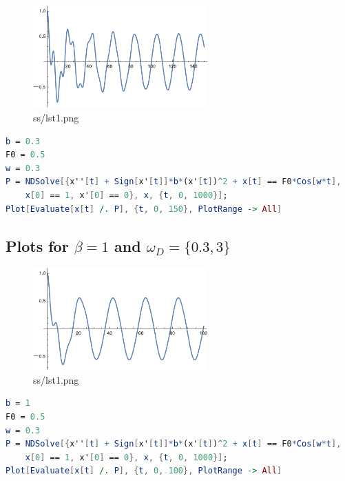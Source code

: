\documentclass[12pt,letter]{article}
\begin{document}
{\begin{tcolorbox}
	\begin{figure}[H]
		\centering
		\includegraphics[width=0.6\textwidth]{ss/lst02.png}
		\caption{ss/lst1.png}
		\label{fig:ss-lst1-png}
	\end{figure}
\begin{lstlisting}[language=Mathematica]
b = 0.3
F0 = 0.5
w = 0.3
P = NDSolve[{x''[t] + Sign[x'[t]]*b*(x'[t])^2 + x[t] == F0*Cos[w*t], 
    x[0] == 1, x'[0] == 0}, x, {t, 0, 1000}];
Plot[Evaluate[x[t] /. P], {t, 0, 150}, PlotRange -> All]
\end{lstlisting}
\end{tcolorbox}



\subsection*{Plots for $\beta = 1$ and $\omega_D = \{0.3, 3\} $ }
\begin{tcolorbox}
	\begin{figure}[H]
		\centering
		\includegraphics[width=0.6\textwidth]{ss/honky3.png}
		\caption{ss/lst1.png}
		\label{fig:ss-lst1-png}
	\end{figure}
\begin{lstlisting}[language=Mathematica]
b = 1
F0 = 0.5
w = 0.3
P = NDSolve[{x''[t] + Sign[x'[t]]*b*(x'[t])^2 + x[t] == F0*Cos[w*t], 
    x[0] == 1, x'[0] == 0}, x, {t, 0, 1000}];
Plot[Evaluate[x[t] /. P], {t, 0, 100}, PlotRange -> All] 
\end{lstlisting}
\end{tcolorbox}


}
\end{document}
